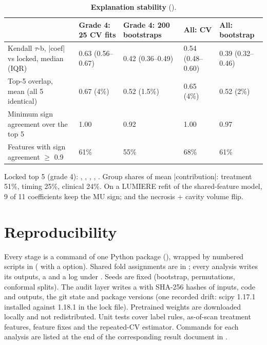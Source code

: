 \documentclass[11pt,a4paper]{article}
\begin{document}
\begin{table}[H]
\centering
\small
\renewcommand{\thetable}{S24}\renewcommand{\theHtable}{S24}
\caption{\textbf{Explanation stability} ().}
\label{tab:S24}
\begin{tabularx}{\linewidth}{@{}L R{2.3cm} R{2.3cm} R{2.3cm} R{2.3cm}@{}}
\toprule
 & Grade 4: 25 CV fits & Grade 4: 200 bootstraps & All: CV & All: bootstrap \\
\midrule
Kendall $\tau$-b, |coef| vs locked, median (IQR) & 0.63 (0.56--0.67) & 0.42 (0.36--0.49) & 0.54 (0.48--0.60) & 0.39 (0.32--0.46) \\
Top-5 overlap, mean (all 5 identical) & 0.67 (4\%) & 0.52 (1.5\%) & 0.65 (4\%) & 0.52 (2\%) \\
Minimum sign agreement over the top 5 & 1.00 & 0.92 & 1.00 & 0.97 \\
Features with sign agreement $\geq$ 0.9 & 61\% & 55\% & 68\% & 61\% \\
\bottomrule
\end{tabularx}
\end{table}

Locked top 5 (grade 4): ,
, ,
, . Group shares of mean
|contribution|: treatment 51\%,
timing 25\%, clinical 24\%. On a LUMIERE refit of the shared-feature model, 9 of 11 coefficients keep the MU
sign;  and the necrosis + cavity volume flip.

\FloatBarrier
\section{Reproducibility}\label{sec:S16}

Every stage is a command of one Python package (), wrapped by numbered scripts
in  ( with a  option). Shared fold
assignments are in
; every analysis writes its outputs, a
 and a log under
. Seeds are fixed (bootstrap, permutations, conformal splits). The audit layer writes a
 with SHA-256 hashes of inputs, code and outputs, the git state and package versions (one
recorded drift: scipy 1.17.1 installed against 1.18.1 in the lock file). Pretrained weights are downloaded
locally and not redistributed. Unit tests cover label rules, as-of-scan treatment features, feature fixes and
the repeated-CV estimator. Commands for each analysis are listed at the end of the corresponding result
document in . 
\end{document}
